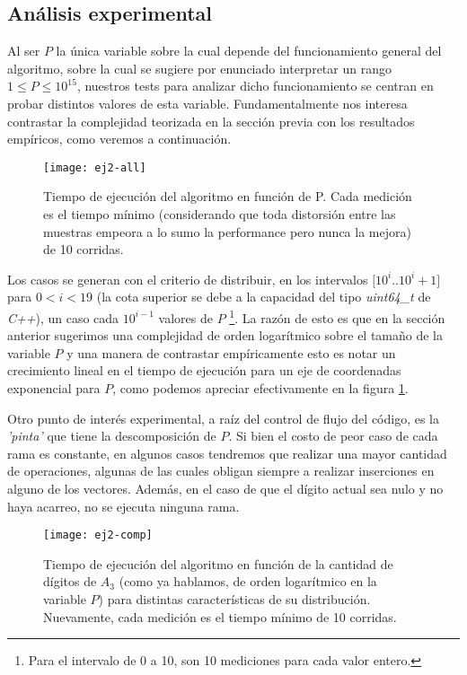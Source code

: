 \subsection{Análisis experimental}

	Al ser $P$ la única variable sobre la cual depende del funcionamiento general del algoritmo, sobre la cual se sugiere por enunciado interpretar un rango $1 \leq P \leq 10^{15}$, nuestros tests para analizar dicho funcionamiento se centran en probar distintos valores de esta variable. Fundamentalmente nos interesa contrastar la complejidad teorizada en la sección previa con los resultados empíricos, como veremos a continuación.
	\\

\begin{figure}[H]
    \centering
    \texttt{[image: ej2-all]}
    \caption{Tiempo de ejecución del algoritmo en función de P. Cada medición es el tiempo mínimo (considerando que toda distorsión entre las muestras empeora a lo sumo la performance pero nunca la mejora) de 10 corridas.}
    \label{fig:ej2-fig}
\end{figure}

	Los casos se generan con el criterio de distribuir, en los intervalos $[10^i$..$10^i+1]$ para $0 < i < 19$ (la cota superior se debe a la capacidad del tipo \emph{uint64_t} de \emph{C++}), un caso cada $10^{i-1}$ valores de $P$ \footnote{Para el intervalo de 0 a 10, son 10 mediciones para cada valor entero.}. La razón de esto es que en la sección anterior sugerimos una complejidad de orden logarítmico sobre el tamaño de la variable $P$ y una manera de contrastar empíricamente esto es notar un crecimiento lineal en el tiempo de ejecución para un eje de coordenadas exponencial para $P$, como podemos apreciar efectivamente en la figura \ref{fig:ej2-fig}.

	Otro punto de interés experimental, a raíz del control de flujo del código, es la \emph{'pinta'} que tiene la descomposición de $P$. Si bien el costo de peor caso de cada rama es constante, en algunos casos tendremos que realizar una mayor cantidad de operaciones, algunas de las cuales obligan siempre a realizar inserciones en alguno de los vectores. Además, en el caso de que el dígito actual sea nulo y no haya acarreo, no se ejecuta ninguna rama.

	\begin{figure}[H]
	    \centering
	    \texttt{[image: ej2-comp]}
	    \caption{Tiempo de ejecución del algoritmo en función de la cantidad de dígitos de $A_3$ (como ya hablamos, de orden logarítmico en la variable $P$) para distintas características de su distribución. Nuevamente, cada medición es el tiempo mínimo de 10 corridas.}
	    \label{fig:ej2-comp}
	\end{figure}

